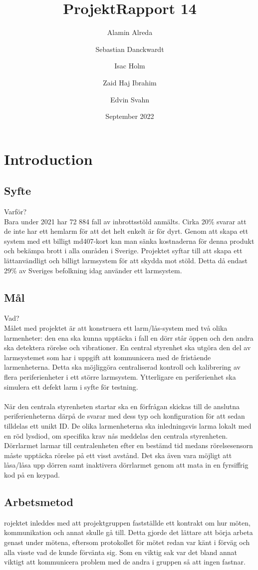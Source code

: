 \documentclass{article}
\title{ProjektRapport 14}
\author{Alamin Alreda \and Sebastian Danckwardt \and Isac Holm \and Zaid Haj Ibrahim   \and Edvin Svahn}
\date{September 2022}
\begin{document}
\maketitle
 
\section{Introduction}
\subsection{Syfte}
Varför?
\\
Bara under 2021 har 72 884 fall av inbrottsstöld anmälts\cite{BRa}. 
Cirka 20\% svarar att de inte har ett hemlarm för att det helt enkelt är för dyrt\cite{MoFor}.
Genom att skapa ett system med ett billigt md407-kort kan man sänka kostnaderna för denna produkt och bekämpa brott i alla områden i Sverige. 
Projektet syftar till att skapa ett lättanvändligt och billigt larmsystem för att skydda mot stöld. 
Detta då endast 29\% av Sveriges befolkning idag använder ett larmsystem\cite{SSF}.
\subsection{Mål}
Vad?
\\
Målet med projektet är att konstruera ett larm/lås-system med två olika larmenheter: 
den ena ska kunna upptäcka i fall en dörr står öppen och den andra ska detektera rörelse och vibrationer. 
En central styrenhet ska utgöra den del av larmsystemet som har i uppgift att kommunicera med de fristående larmenheterna. 
Detta ska möjliggöra centraliserad kontroll och kalibrering av flera periferienheter i ett större larmsystem. 
Ytterligare en periferienhet ska simulera ett defekt larm i syfte för testning.
\\\\
När den centrala styrenheten startar ska en förfrågan skickas till de anslutna periferienheterna därpå de svarar med dess typ och konfiguration för att sedan tilldelas ett unikt ID. De olika larmenheterna ska inledningsvis larma lokalt med en röd lysdiod, om specifika krav nås meddelas den centrala styrenheten. Dörrlarmet larmar till centralenheten efter en bestämd tid medans rörelsesensorn måste upptäcka rörelse på ett visst avstånd. Det ska även vara möjligt att låsa/låsa upp dörren samt inaktivera dörrlarmet genom att mata in en fyrsiffrig kod på en keypad.


\subsection{Arbetsmetod}
rojektet inleddes med att projektgruppen fastställde ett kontrakt om hur möten, kommunikation och annat skulle gå till. Detta gjorde det lättare att börja arbeta genast under mötena, eftersom protokollet för mötet redan var känt i förväg och alla visste vad de kunde förvänta sig. Som en viktig sak var det bland annat viktigt att kommunicera problem med de andra i gruppen så att ingen fastnar.
\end{document}
